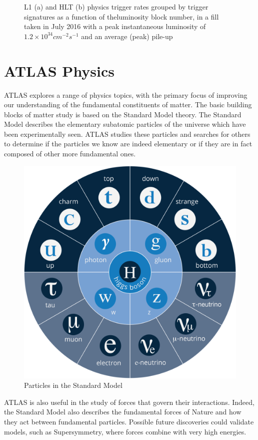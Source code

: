 \documentclass[a4paper, oneside]{book}
\begin{document}
					\begin{figure}
						\centering
						 \quad
						\caption{L1 (a) and HLT (b) physics trigger rates grouped by trigger signatures as a function of theluminosity block number, in a fill taken in July 2016 with a peak instantaneous luminosity of $1.2 \times 10^{34}cm^{-2}s^{-1}$ and an average (peak) pile-up }
						\label{fig:Trigger system}
					\end{figure}
		\section{ATLAS Physics}
			\cite{STD Model}ATLAS explores a range of physics topics, with the primary focus of improving our understanding of the fundamental constituents of matter. The basic building blocks of matter study is based on the Standard Model theory. The Standard Model describes the elementary subatomic particles of the universe which have been experimentally seen. ATLAS studies these particles and searches for others to determine if the particles we know are indeed elementary or if they are in fact composed of other more fundamental ones. 
			\begin{figure}[h!]
				\centering
				\includegraphics[width=.3\textwidth]{tesi_images/STD_model.png}
				\caption{Particles in the Standard Model}
				\label{fig:STD model}
			\end{figure}
			ATLAS is also useful in the study of forces that govern their interactions. Indeed, the Standard Model also describes the fundamental forces of Nature and how they act between fundamental particles. Possible future discoveries could validate models, such as Supersymmetry, where forces combine with very high energies.
			
\end{document}
